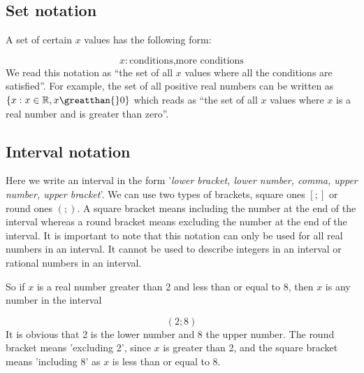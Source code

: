 \subsection*{ Set notation}
\nopagebreak
\label{m39337*id236056}A set of certain $x$ values has the following form:\par 
\label{m39337*uid43}\nopagebreak\noindent{}
\begin{equation}
x:\mbox{conditions,more conditions}
\end{equation}
\label{m39337*id236100}We read this notation as ``the set of all $x$ values where all the conditions are satisfied''. For example, the set of all positive real numbers can be written as $\{x:x\in \mathbb{R},x\greatthan{}0\}$ which reads as ``the set of all $x$ values where $x$ is a real number and is greater than zero''.\par 
\label{m39337*uid44}
\subsection*{ Interval notation}
\nopagebreak
\label{m39337*id236181}Here we write an interval in the form '\textsl{lower bracket, lower number, comma, upper number, upper bracket}'. We can use two types of brackets, square ones $\left[;\right]$ or round ones $\left(;\right)$. A square bracket means including the number at the end of the interval whereas a round bracket means excluding the number at the end of the interval. It is important to note that this notation can only be used for all real numbers in an interval. It cannot be used to describe integers in an interval or rational numbers in an interval.\par 
\label{m39337*id236225}So if $x$ is a real number greater than 2 and less than or equal to 8, then $x$ is any number in the interval\par 
\label{m39337*uid45}\nopagebreak\noindent{}
\begin{equation}
\left(2;8\right)
\end{equation}
\label{m39337*id236274}It is obvious that 2 is the lower number and 8 the upper number. The round bracket means 'excluding 2', since $x$ is greater than 2, and the square bracket means 'including 8' as $x$ is less than or equal to 8.\par 
\label{m39337*uid46}
